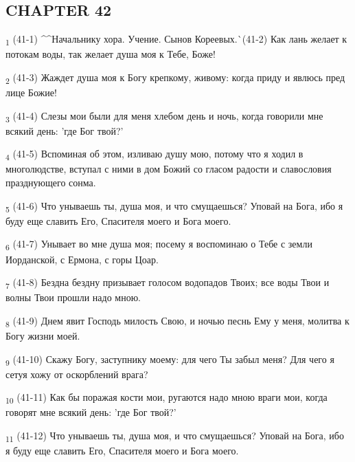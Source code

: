 \subsection{CHAPTER 42}
\begin{tcolorbox}
\textsubscript{1} (41-1) ^^Начальнику хора. Учение. Сынов Кореевых.^^ (41-2) Как лань желает к потокам воды, так желает душа моя к Тебе, Боже!
\end{tcolorbox}
\begin{tcolorbox}
\textsubscript{2} (41-3) Жаждет душа моя к Богу крепкому, живому: когда приду и явлюсь пред лице Божие!
\end{tcolorbox}
\begin{tcolorbox}
\textsubscript{3} (41-4) Слезы мои были для меня хлебом день и ночь, когда говорили мне всякий день: 'где Бог твой?'
\end{tcolorbox}
\begin{tcolorbox}
\textsubscript{4} (41-5) Вспоминая об этом, изливаю душу мою, потому что я ходил в многолюдстве, вступал с ними в дом Божий со гласом радости и славословия празднующего сонма.
\end{tcolorbox}
\begin{tcolorbox}
\textsubscript{5} (41-6) Что унываешь ты, душа моя, и что смущаешься? Уповай на Бога, ибо я буду еще славить Его, Спасителя моего и Бога моего.
\end{tcolorbox}
\begin{tcolorbox}
\textsubscript{6} (41-7) Унывает во мне душа моя; посему я воспоминаю о Тебе с земли Иорданской, с Ермона, с горы Цоар.
\end{tcolorbox}
\begin{tcolorbox}
\textsubscript{7} (41-8) Бездна бездну призывает голосом водопадов Твоих; все воды Твои и волны Твои прошли надо мною.
\end{tcolorbox}
\begin{tcolorbox}
\textsubscript{8} (41-9) Днем явит Господь милость Свою, и ночью песнь Ему у меня, молитва к Богу жизни моей.
\end{tcolorbox}
\begin{tcolorbox}
\textsubscript{9} (41-10) Скажу Богу, заступнику моему: для чего Ты забыл меня? Для чего я сетуя хожу от оскорблений врага?
\end{tcolorbox}
\begin{tcolorbox}
\textsubscript{10} (41-11) Как бы поражая кости мои, ругаются надо мною враги мои, когда говорят мне всякий день: 'где Бог твой?'
\end{tcolorbox}
\begin{tcolorbox}
\textsubscript{11} (41-12) Что унываешь ты, душа моя, и что смущаешься? Уповай на Бога, ибо я буду еще славить Его, Спасителя моего и Бога моего.
\end{tcolorbox}
